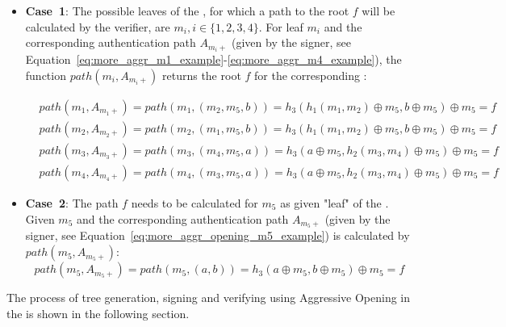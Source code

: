 \begin{itemize}
\item \textbf{Case~1}: The possible leaves of the \tfblock, for which a path to the root $f$ will be calculated by the verifier, are $m_i, i \in \{1,2,3,4\}$. For leaf $m_i$ and the corresponding authentication path $A_{m_i+}$ (given by the signer, see Equation~\ref{eq:more_aggr_m1_example}-\ref{eq:more_aggr_m4_example}), the function $path(m_i,A_{m_i+})$ returns the root $f$ for the corresponding \tfblock:

\begin{align}
&path(m_1, A_{m_1+}) = path(m_1, (m_2, m_5, b)) = h_3(h_1(m_1, m_2) \oplus m_5, b \oplus m_5) \oplus m_5 = f \label{eq:more_aggr_path_m1}\\
&path(m_2, A_{m_2+}) = path(m_2, (m_1, m_5, b)) = h_3(h_1(m_1, m_2) \oplus m_5, b \oplus m_5) \oplus m_5 = f\\
&path(m_3, A_{m_3+}) = path(m_3, (m_4, m_5, a)) = h_3(a \oplus m_5, h_2(m_3, m_4) \oplus m_5) \oplus m_5 = f \\
&path(m_4, A_{m_4+}) = path(m_4, (m_3, m_5, a)) = h_3(a \oplus m_5, h_2(m_3, m_4) \oplus m_5) \oplus m_5 = f \label{eq:more_aggr_path_m4}
\end{align}

\item \textbf{Case~2}: The path $f$ needs to be calculated for $m_5$ as given "leaf" of the \tfblock. Given $m_5$ and the corresponding authentication path $A_{m_5+}$ (given by the signer, see Equation~\ref{eq:more_aggr_opening_m5_example}) is calculated by $path(m_5, A_{m_5+})$:
\begin{equation}
\label{eq:more_aggr_path_m5}
path(m_5, A_{m_5+}) =  path(m_5, (a,b)) = h_3(a \oplus m_5, b \oplus m_5) \oplus m_5 = f
\end{equation}
\end{itemize}

The process of tree generation, signing and verifying using Aggressive Opening in the \extree is shown in the following section. 


